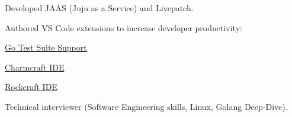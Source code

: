 \documentclass[9pt,a4paper]{extarticle}
\begin{document}


\begin{customitemize}
    \item {}
    \begin{customitemize}
        \item {}
        \begin{customitemize}
            \item[] {}
            \item{Developed JAAS (Juju as a Service) and Livepatch.}
            \item{Authored VS Code extensions to increase developer productivity:}
            \begin{customitemize}
                \item{\href{https://marketplace.visualstudio.com/items?itemName=babakks.vscode-go-test-suite}{Go Test Suite Support} }
                \item{\href{https://marketplace.visualstudio.com/items?itemName=babakks.vscode-juju-charmcraft-ide}{Charmcraft IDE} }
                \item{\href{https://marketplace.visualstudio.com/items?itemName=babakks.vscode-rockcraft-ide}{Rockcraft IDE} }
            \end{customitemize}
            \item{Technical interviewer (Software Engineering skills, Linux, Golang Deep-Dive).}
        \end{customitemize}
    \end{customitemize}


\end{customitemize}
\end{document}
